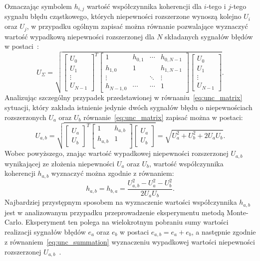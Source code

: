 Oznaczając symbolem $h_{i,j}$ wartość współczynnika koherencji dla $i$-tego i $j$-tego sygnału błędu cząstkowego, których niepewności rozszerzone wynoszą kolejno $U_{i}$ oraz $U_{j}$, w przypadku ogólnym zapisać można równanie pozwalające wyznaczyć wartość wypadkową niepewności rozszerzonej dla $N$ składanych sygnałów błędów w postaci~\cite{jakubiec_reductive}:
\begin{equation}
U_{\Sigma} = \sqrt{
\begin{bmatrix}
U_{0} \\ U_{1} \\ \vdots \\ U_{N-1}
\end{bmatrix}^{T}
\begin{bmatrix}
1         & h_{0,1} & \cdots & h_{0,N-1} \\
h_{1,0}   & 1       &        & h_{1,N-1} \\
\vdots    &         & \ddots & \vdots    \\
h_{N-1,0} & \cdots  & \cdots & 1
\end{bmatrix}
\begin{bmatrix}
U_{0} \\ U_{1} \\ \vdots \\ U_{N-1}
\end{bmatrix}}
\label{eq:unc_matrix}.
\end{equation}
Analizując szczególny przypadek przedstawionej w równaniu~\eqref{eq:unc_matrix} sytuacji, który zakłada istnienie jedynie dwóch sygnałów błędu o niepewnościach rozszerzonych $U_{a}$ oraz $U_{b}$ równanie~\eqref{eq:unc_matrix} zapisać można w postaci:
\begin{equation}
U_{a,b} = \sqrt{
\begin{bmatrix}
U_{a} \\ U_{b}
\end{bmatrix}^{T}
\begin{bmatrix}
1         & h_{a,b} \\
h_{a,b}   & 1       \\
\end{bmatrix}
\begin{bmatrix}
U_{a} \\ U_{b}
\end{bmatrix}} =
\sqrt{U_{a}^{2} + U_{b}^{2} + 2 U_{a} U_{b}}
\label{eq:unc_mattwo}.
\end{equation}
Wobec powyższego, znając wartość wypadkowej niepewności rozszerzonej $U_{a,b}$ wynikającej ze złożenia niepewności $U_{a}$ oraz $U_{b}$, wartość współczynnika koherencji $h_{a,b}$ wyznaczyć można zgodnie z równaniem:
\begin{equation}
h_{a,b} = h_{b,a} = \frac{U_{a,b}^{2} - U_{a}^{2} - U_{b}^{2}}{2 U_{a} U_{b}} \label{eq:unc_cohertwo}.
\end{equation}
Najbardziej przystępnym sposobem na wyznaczenie wartości współczynnika $h_{a,b}$ jest w analizowanym przypadku przeprowadzenie eksperymentu metodą Monte-Carlo. Eksperyment ten polega na wielokrotnym pobraniu sumy wartości realizacji sygnałów błędów $e_{a}$ oraz $e_{b}$ w postaci $e_{a,b} = e_{a} + e_{b}$, a następnie zgodnie z równaniem~\eqref{eq:unc_summation} wyznaczeniu wypadkowej wartości niepewności rozszerzonej $U_{a,b}$~\cite{jcgm_montecarlo}.


